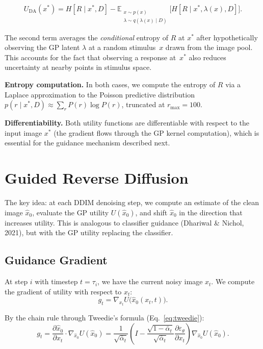 \documentclass[11pt]{article}
\newcommand{\E}{\mathbb{E}}
\begin{document}
\begin{equation}\label{eq:utility_da}
  U_{\text{DA}}(x^*)
  = H[R \mid x^*, D]
  - \E_{\substack{x \sim p(x) \\ \lambda \sim q(\lambda(x) \mid D)}}
    \bigl[ H[R \mid x^*, \lambda(x), D] \bigr].
\end{equation}

The second term averages the \emph{conditional} entropy of $R$ at $x^*$
after hypothetically observing the GP latent $\lambda$ at a random stimulus~$x$
drawn from the image pool.
This accounts for the fact that observing a response at~$x^*$
also reduces uncertainty at nearby points in stimulus space.

\medskip
\noindent\textbf{Entropy computation.}
In both cases, we compute the entropy of $R$ via a Laplace approximation
to the Poisson predictive distribution
$p(r \mid x^*, D) \approx \sum_r P(r) \log P(r)$,
truncated at $r_{\max} = 100$.

\medskip
\noindent\textbf{Differentiability.}
Both utility functions are differentiable with respect to the input image $x^*$
(the gradient flows through the GP kernel computation), which is essential
for the guidance mechanism described next.


\section{Guided Reverse Diffusion}

The key idea: at each DDIM denoising step, we compute an estimate of the
clean image $\hat x_0$, evaluate the GP utility $U(\hat x_0)$, and shift
$\hat x_0$ in the direction that increases utility.
This is analogous to classifier guidance (Dhariwal \& Nichol, 2021), but with
the GP utility replacing the classifier.

\subsection{Guidance Gradient}

At step $i$ with timestep $t = \tau_i$, we have the current noisy image $x_t$.
We compute the gradient of utility with respect to $x_t$:
\begin{equation}\label{eq:guidance_grad}
  g_t = \nabla_{x_t} U\!\bigl(\hat x_0(x_t, t)\bigr).
\end{equation}

By the chain rule through Tweedie's formula (Eq.~\ref{eq:tweedie}):
\[
  g_t
  = \frac{\partial \hat x_0}{\partial x_t} \cdot \nabla_{\hat x_0} U(\hat x_0)
  = \frac{1}{\sqrt{\bar\alpha_t}}
    \left(I - \frac{\sqrt{1 - \bar\alpha_t}}{\sqrt{\bar\alpha_t}}
    \frac{\partial \varepsilon_\theta}{\partial x_t}\right)
    \nabla_{\hat x_0} U(\hat x_0).
\]
\end{document}
